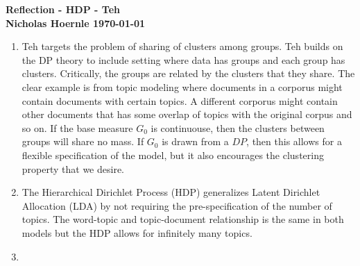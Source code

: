 \documentclass[twoside]{article}
\begin{document}
\textbf{Reflection - HDP - Teh}\\
\textbf{Nicholas Hoernle \hfill \today}

\begin{enumerate}
  \item Teh targets the problem of sharing of clusters among groups. Teh builds on the DP theory to include setting where data has groups and each group has clusters. Critically, the groups are related by the clusters that they share. The clear example is from topic modeling where documents in a corporus might contain documents with certain topics. A different corporus might contain other documents that has some overlap of topics with the original corpus and so on. If the base measure $G_0$ is continuouse, then the clusters between groups will share no mass. If $G_0$ is drawn from a $DP$, then this allows for a flexible specification of the model, but it also encourages the clustering property that we desire.
  \item The Hierarchical Dirichlet Process (HDP) generalizes Latent Dirichlet Allocation (LDA) by not requiring the pre-specification of the number of topics. The word-topic and topic-document relationship is the same in both models but the HDP allows for infinitely many topics.
  \item
\end{enumerate}


% 
\end{document}
